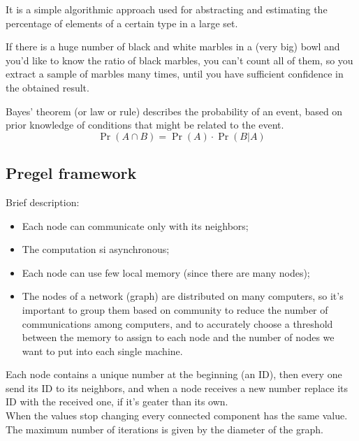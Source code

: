     \begin{defn}[Sampling]\label{def:sampling}
        It is a simple algorithmic approach used for abstracting and estimating the percentage of elements of a certain type in a large set.
        
        \ex If there is a huge number of black and white marbles in a (very big) bowl and you'd like to know the ratio of black marbles, you can't count all of them, so you extract a sample of marbles many times, until you have sufficient confidence in the obtained result.
    \end{defn}
    
    \begin{defn}
        Bayes’ theorem (or law or rule) describes the probability of an event, based on prior knowledge of conditions that might be related to the event.
        \begin{equation}\label{eq-bayes}
            \Pr{(A \cap B)} = \Pr{(A)} \cdot \Pr{(B | A)}
        \end{equation}
    \end{defn}


\subsection{Pregel framework}

    Brief description:
    \begin{itemize}
        \item Each node can communicate only with its neighbors;
        \item The computation si asynchronous;
        \item Each node can use few local memory (since there are many nodes);
        \item The nodes of a network (graph) are distributed on many computers, so it's important to group them based on community to reduce the number of communications among computers, and to accurately choose a threshold between the memory to assign to each node and the number of nodes we want to put into each single machine.
    \end{itemize}
    
    \begin{ex}
        Each node contains a unique number at the beginning (an ID), then every one send its ID to its neighbors, and when a node receives a new number replace its ID with the received one, if it's geater than its own. \\
        When the values stop changing every connected component has the same value.
        The maximum number of iterations is given by the diameter of the graph.
    \end{ex}


